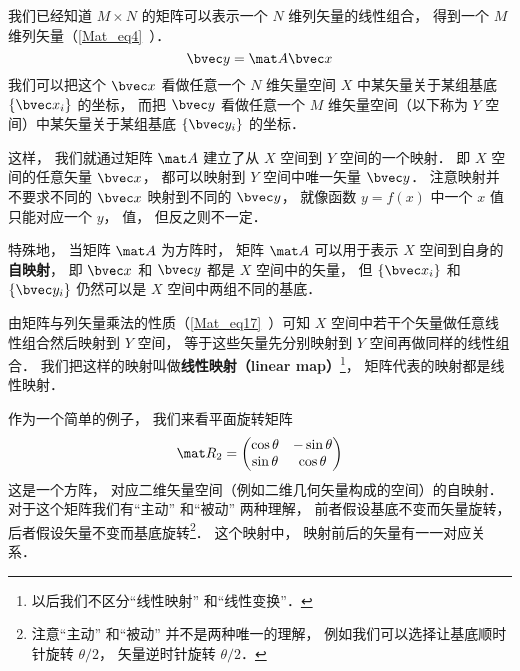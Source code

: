 


我们已经知道 $M\times N$ 的矩阵可以表示一个 $N$ 维列矢量的线性组合， 得到一个 $M$ 维列矢量（\autoref{Mat_eq4}~）．
\begin{equation}\label{MatLS_eq1}
\bvec y = \mat A \bvec x
\end{equation}
我们可以把这个 $\bvec x$ 看做任意一个 $N$ 维矢量空间 $X$ 中某矢量关于某组基底 $\{\bvec x_i\}$ 的坐标， 而把 $\bvec y$ 看做任意一个 $M$ 维矢量空间（以下称为 $Y$ 空间）中某矢量关于某组基底 $\{\bvec y_i\}$ 的坐标．

这样， 我们就通过矩阵 $\mat A$ 建立了从 $X$ 空间到 $Y$ 空间的一个映射． 即 $X$ 空间的任意矢量 $\bvec x$， 都可以映射到 $Y$ 空间中唯一矢量 $\bvec y$． 注意映射并不要求不同的 $\bvec x$ 映射到不同的 $\bvec y$， 就像函数 $y = f(x)$ 中一个 $x$ 值只能对应一个 $y$， 值， 但反之则不一定．

特殊地， 当矩阵 $\mat A$ 为方阵时， 矩阵 $\mat A$ 可以用于表示 $X$ 空间到自身的\textbf{自映射}， 即 $\bvec x$ 和 $\bvec y$ 都是 $X$ 空间中的矢量， 但 $\{\bvec x_i\}$ 和 $\{\bvec y_i\}$ 仍然可以是 $X$ 空间中两组不同的基底．

由矩阵与列矢量乘法的性质（\autoref{Mat_eq17}~）可知 $X$ 空间中若干个矢量做任意线性组合然后映射到 $Y$ 空间， 等于这些矢量先分别映射到 $Y$ 空间再做同样的线性组合． 我们把这样的映射叫做\textbf{线性映射（linear map）}\footnote{以后我们不区分“线性映射” 和“线性变换”．}， 矩阵代表的映射都是线性映射．

作为一个简单的例子， 我们来看平面旋转矩阵
\begin{equation}
\mat R_2 = \begin{pmatrix}
\cos\theta & - \sin\theta\\
\sin\theta &\cos\theta
\end{pmatrix}
\end{equation}
这是一个方阵， 对应二维矢量空间（例如二维几何矢量构成的空间）的自映射． 对于这个矩阵我们有“主动” 和“被动” 两种理解， 前者假设基底不变而矢量旋转， 后者假设矢量不变而基底旋转\footnote{注意“主动” 和“被动” 并不是两种唯一的理解， 例如我们可以选择让基底顺时针旋转 $\theta/2$， 矢量逆时针旋转 $\theta/2$．}． 这个映射中， 映射前后的矢量有一一对应关系．

